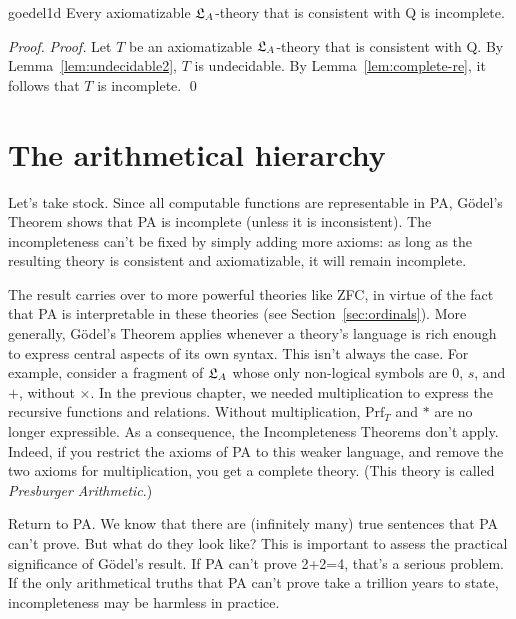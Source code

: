 \begin{theorem}{}{goedel1d}
  Every axiomatizable $\mathfrak{L}_A$-theory that is consistent with Q is incomplete.
\end{theorem}
\begin{proof}
  \emph{Proof.}
  Let $T$ be an axiomatizable $\mathfrak{L}_A$-theory that is consistent with Q.
  By Lemma~\ref{lem:undecidable2},
  $T$ is undecidable.
  By Lemma~\ref{lem:complete-re},
  it follows that $T$ is incomplete.
  \qed
\end{proof}

\section{The arithmetical hierarchy}

Let's take stock.
Since all computable functions are representable in PA,
Gödel's Theorem shows that PA is incomplete
(unless it is inconsistent).
The incompleteness can't be fixed by simply adding more axioms:
as long as the resulting theory is
consistent and axiomatizable,
it will remain incomplete.

The result carries over to more powerful theories like ZFC,
in virtue of the fact that PA is interpretable in these theories
(see Section~\ref{sec:ordinals}).
More generally,
Gödel's Theorem applies whenever a theory's language is rich enough to express
central aspects of its own syntax.
This isn't always the case.
For example,
consider a fragment of $\mathfrak{L}_A$ whose only non-logical symbols are $0$, $s$, and $+$, without $\times$.
In the previous chapter,
we needed multiplication to express the recursive functions and relations.
Without multiplication, 
$\mathrm{Prf}_T$ and $*$ are no longer expressible.
As a consequence,
the Incompleteness Theorems don't apply.
Indeed,
if you restrict the axioms of PA to this weaker language,
and remove the two axioms for multiplication,
you get a complete theory.
(This theory is called \emph{Presburger Arithmetic}.)

Return to PA.
We know that there are (infinitely many) true sentences that PA can't prove.
But what do they look like?
This is important to assess the practical significance of Gödel's result.
If PA can't prove 2+2=4,
that's a serious problem.
If the only arithmetical truths that PA can't prove take a trillion years to state,
incompleteness may be harmless in practice.

